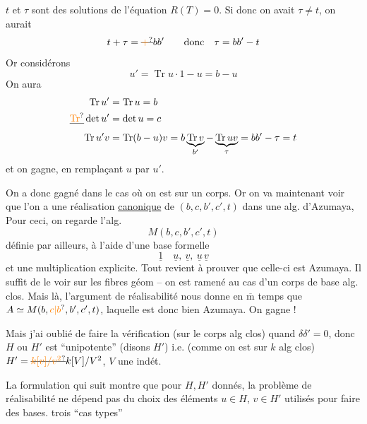 $t$ et $\tau$ sont des solutions de l'équation $R(T)=0$. Si donc on avait $\tau\ne t$, on aurait
\[
t+\tau=\deleted{\unsure{+}}bb'\qquad\text{donc}\quad\tau=bb'-t
\]
Or considérons
\[
u'=\operatorname{Tr}u\cdot1-u=b-u
\]
On aura
\[
\begin{aligned}
\operatorname{Tr}u'&=\operatorname{Tr}u=b\\ \deleted{\unsure{\operatorname{Tr}}}\det u'&=\det u=c\\ \operatorname{Tr}u'v&=\operatorname{Tr}(b-u)v=b\underbrace{\operatorname{Tr}v}_{b'}-\underbrace{\operatorname{Tr}uv}_{\tau}=bb'-\tau=t
\end{aligned}
\]
et on gagne, en remplaçant $u$ par $u'$.

 On a donc gagné dans le cas où on est sur un corps. Or on va maintenant voir que l'on a une réalisation \uline{canonique} de  $(b,c,b',c',t)$ dans une alg. d'Azumaya, Pour ceci, on regarde l'alg.
\[
M(b,c,b',c',t)
\]
définie par ailleurs, à l'aide d'une base formelle
\[
\underline{1}\quad\underline{u},\ \underline{v},\ \underline{u}\,\underline{v}
\]
et une multiplication explicite. Tout revient à prouver que celle-ci est Azumaya. Il suffit de le voir sur les fibres géom -- on est ramené au cas d'un corps de base alg. clos. Mais là, l'argument
de réalisabilité nous donne en $\overline{\mathrm m}$ temps que $A\simeq M(b,\unsure{c|b},b',c',t)$, laquelle est donc bien Azumaya. On gagne !

Mais j'ai oublié de faire la vérification (sur le  corps alg clos) quand $\delta\delta'=0$, donc $H$ ou $H'$ est ``unipotente''  (disons $H'$) i.e.   (comme on est sur $k$ alg clos)  $H'=\deleted{\unsure{k[v]/v^2}}k[V]/V^2$, $V$ une indét. 

La formulation qui suit montre que pour $H,H'$ donnés, la  problème de réalisabilité ne dépend pas du choix des  éléments $u\in H$, $v\in H'$ utilisés pour faire des bases.   trois ``cas types''

